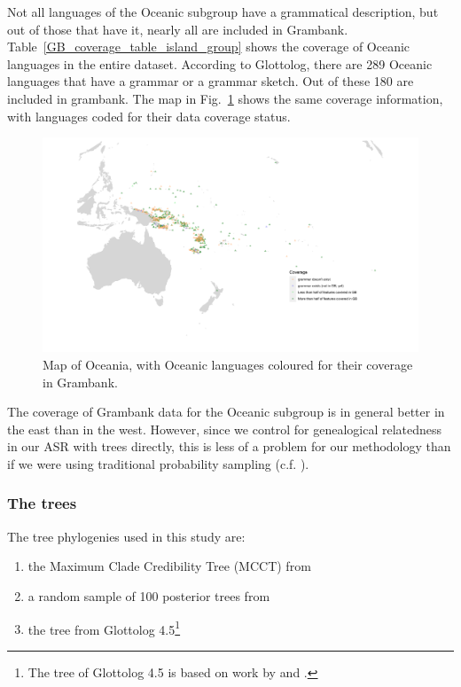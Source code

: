 \documentclass[12pt,letterpaper]{article}
\begin{document}
Not all languages of the Oceanic subgroup have a grammatical description, but out of those that have it, nearly all are included in Grambank. Table~\ref{GB_coverage_table_island_group} shows the coverage of Oceanic languages in the entire dataset. According to Glottolog, there are 289 Oceanic languages that have a grammar or a grammar sketch. Out of these 180 are included in grambank. The map in Fig.~\ref{GB_austro_coverage} shows the same coverage information, with languages coded for their data coverage status.



\begin{figure}
\centering
\includegraphics[width=\textwidth]{illustrations/plots_from_R/coverage_plots/maps/coverage_map_oceanic.png}
\caption{Map of Oceania, with Oceanic languages coloured for their coverage in Grambank.}
\label{GB_austro_coverage}
\end{figure} %

The coverage of Grambank data for the Oceanic subgroup is in general better in the east than in the west. However, since we control for genealogical relatedness in our ASR with trees directly, this is less of a problem for our methodology than if we were using traditional probability sampling (c.f. \citet{ross2004morphosyntactic}).

\FloatBarrier
\subsubsection{The trees}
\label{the_trees}
The tree phylogenies used in this study are: 

\begin{enumerate}[label=(\alph*)]
    \item the Maximum Clade Credibility Tree (MCCT) from \citet{grayetal_2009}
    \item a random sample of 100 posterior trees from \citet{grayetal_2009} 
    \item the tree from Glottolog 4.5\footnote{The tree of Glottolog 4.5 \citep{glottolog4_5} is based on work by \citet{blust_2009, blust_2014} and \citet{blust_chen_2017}.}
\end{enumerate}
\end{document}
